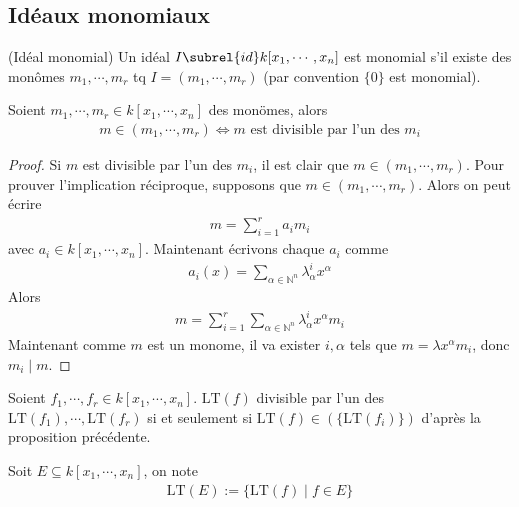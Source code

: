         \subsection{Idéaux monomiaux}
            \begin{defi} (Idéal monomial)
                Un idéal $I \subrel{id} k[x_1, \cdots, x_n]$ est monomial s'il existe des monômes $m_1, \cdots, m_r$ tq $I = (m_1, \cdots, m_r)$ (par convention $\{0\}$ est monomial).
            \end{defi}
            \begin{prop}
                \label{lemme_nul}
                Soient $m_1, \cdots, m_r \in k[x_1, \cdots, x_n]$ des monömes, alors 
                \begin{align*}
                    m \in (m_1, \cdots, m_r) \iff m \text{ est divisible par l'un des } m_i
                \end{align*}
            \end{prop}
            \begin{proof}
                Si $m$ est divisible par l'un des $m_i$, il est clair que $m \in (m_1, \cdots, m_r)$. Pour prouver l'implication réciproque, supposons que $m \in (m_1, \cdots, m_r)$. Alors on peut écrire
                \begin{align*}
                    m = \sum_{i = 1}^r a_i m_i
                \end{align*}
                avec $a_i \in k[x_1, \cdots, x_n]$. Maintenant écrivons chaque $a_i$ comme
                \begin{align*}
                    a_i(x) = \sum_{\alpha \in \mathbb{N}^n} \lambda_\alpha^i x^{\alpha}
                \end{align*}
                Alors
                \begin{align*}
                    m = \sum_{i = 1}^r \sum_{\alpha \in \mathbb{N}^n} \lambda_\alpha^i x^{\alpha} m_i
                \end{align*}
                Maintenant comme $m$ est un monome, il va exister $i, \alpha$ tels que $m = \lambda x^\alpha m_i$, donc $m_i \mid m$.
            \end{proof}
            Soient $f_1, \cdots, f_r \in k[x_1, \cdots, x_n]$. $\mathrm{LT}(f)$ divisible par l'un des $\mathrm{LT}(f_1), \cdots, \mathrm{LT}(f_r)$ si et seulement si $\mathrm{LT}(f) \in (\{\mathrm{LT}(f_i)\})$ d'après la proposition précédente. \\
            \begin{nota}
                Soit $E \subseteq k[x_1, \cdots, x_n]$, on note
                \begin{align*}
                    \mathrm{LT}(E) := \{\mathrm{LT}(f) \mid f \in E\}
                \end{align*}
            \end{nota}

